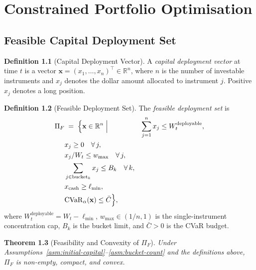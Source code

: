 \documentclass[12pt,openany]{book}
\newcommand{\bfx}{\mathbf{x}}
\numberwithin{equation}{chapter}
\theoremstyle{plain}
\newtheorem{theorem}{Theorem}[chapter]
\theoremstyle{definition}
\newtheorem{definition}[theorem]{Definition}
\theoremstyle{remark}
\numberwithin{equation}{chapter}
\theoremstyle{plain}
\begin{document}
\chapter{Constrained Portfolio Optimisation}
\label{ch:constrained-opt}

\section{Feasible Capital Deployment Set}

\begin{definition}[Capital Deployment Vector]
\label{def:deployment-vector}
A \emph{capital deployment vector} at time $t$ is a vector
$\bfx = (x_1,\ldots,x_n)^\top \in \mathbb{R}^n$, where $n$ is the
number of investable instruments and $x_j$ denotes the dollar amount
allocated to instrument $j$.  Positive $x_j$ denotes a long position.
\end{definition}

\begin{definition}[Feasible Deployment Set]
\label{def:feasible-set}
\label{asm:feasible-set}
The \emph{feasible deployment set} is
\begin{align}
  \Pi_F
  &\;=\;
  \Bigl\{
    \bfx \in \mathbb{R}^n
    \;\Big|\;
    &\sum_{j=1}^n x_j \leq W_t^{\mathrm{deployable}},
    \label{eq:budget-constr}\\
    &x_j \geq 0 \quad \forall\,j,
    \label{eq:long-only-constr}\\
    &x_j / W_t \leq w_{\max} \quad \forall\,j,
    \label{eq:concentration-constr}\\
    &\sum_{j \in \mathrm{bucket}_k} x_j \leq B_k \quad \forall\,k,
    \label{eq:bucket-constr}\\
    &x_{\mathrm{cash}} \geq \ell_{\min},
    \label{eq:liquidity-constr}\\
    &\mathrm{CVaR}_\alpha(\bfx) \leq \bar{C}
    \label{eq:cvar-constr}
  \Bigr\},
\end{align}
where $W_t^{\mathrm{deployable}} = W_t - \ell_{\min}$,
$w_{\max} \in (1/n, 1)$ is the single-instrument concentration cap,
$B_k$ is the bucket limit, and $\bar{C} > 0$ is the CVaR budget.
\end{definition}

\begin{theorem}[Feasibility and Convexity of $\Pi_F$]
\label{thm:feasible-convex}
Under Assumptions~\ref{asm:initial-capital}--\ref{asm:bucket-count}
and the definitions above, $\Pi_F$ is non-empty, compact, and convex.
\end{theorem}
\end{document}
